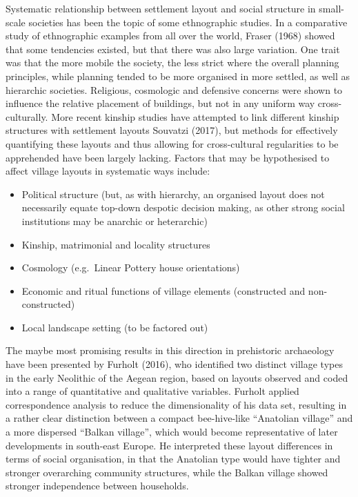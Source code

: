 \documentclass[
  12pt,
  a4paper, twoside]{book}
\begin{document}
Systematic relationship between settlement layout and social structure in small-scale societies has been the topic of some ethnographic studies. In a comparative study of ethnographic examples from all over the world, Fraser (1968) showed that some tendencies existed, but that there was also large variation. One trait was that the more mobile the society, the less strict where the overall planning principles, while planning tended to be more organised in more settled, as well as hierarchic societies. Religious, cosmologic and defensive concerns were shown to influence the relative placement of buildings, but not in any uniform way cross-culturally. More recent kinship studies have attempted to link different kinship structures with settlement layouts Souvatzi (2017), but methods for effectively quantifying these layouts and thus allowing for cross-cultural regularities to be apprehended have been largely lacking. Factors that may be hypothesised to affect village layouts in systematic ways include:

\begin{itemize}
\item
  Political structure (but, as with hierarchy, an organised layout does not necessarily equate top-down despotic decision making, as other strong social institutions may be anarchic or heterarchic)
\item
  Kinship, matrimonial and locality structures
\item
  Cosmology (e.g.~Linear Pottery house orientations)
\item
  Economic and ritual functions of village elements (constructed and non-constructed)
\item
  Local landscape setting (to be factored out)
\end{itemize}

The maybe most promising results in this direction in prehistoric archaeology have been presented by Furholt (2016), who identified two distinct village types in the early Neolithic of the Aegean region, based on layouts observed and coded into a range of quantitative and qualitative variables. Furholt applied correspondence analysis to reduce the dimensionality of his data set, resulting in a rather clear distinction between a compact bee-hive-like ``Anatolian village'' and a more dispersed ``Balkan village'', which would become representative of later developments in south-east Europe. He interpreted these layout differences in terms of social organisation, in that the Anatolian type would have tighter and stronger overarching community structures, while the Balkan village showed stronger independence between households.
\end{document}
